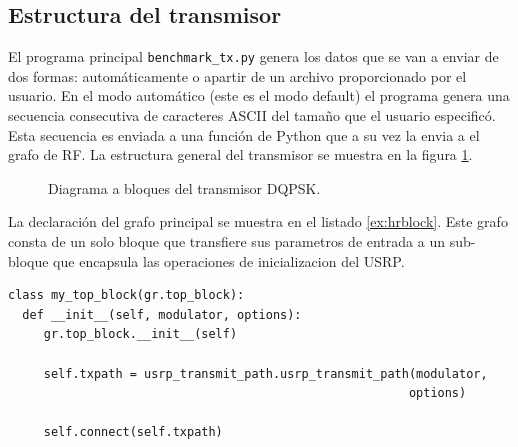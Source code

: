 \subsection{Estructura del transmisor}
El programa principal \verb|benchmark_tx.py| genera los datos que se van a enviar de dos formas:
autom\'aticamente o apartir de un archivo proporcionado por el usuario. En el modo autom\'atico
(este es el modo default) el programa genera una secuencia consecutiva de caracteres ASCII del tama\~no
que el usuario especific\'o. Esta secuencia es enviada a una funci\'on de Python que a su vez la
envia a el grafo de RF. La estructura general del transmisor se muestra en la figura
\ref{fig:grqpsk}.

\begin{figure}[htp]
  \centering
  \vspace{0.5in}
\vspace{0.5in}
\caption{Diagrama a bloques del transmisor DQPSK.}
\label{fig:grqpsk}
\end{figure}

La declaraci\'on del grafo principal se muestra en el listado \ref{ex:hrblock}. Este grafo consta de
un solo bloque que transfiere sus parametros de entrada a un sub-bloque que encapsula las
operaciones de inicializacion del USRP.
 
\begin{lstlisting}[float,frame=single,label=ex:hrblock,caption={Declaraci\'on del bloque
jer\'arquico principal.}]
class my_top_block(gr.top_block):
  def __init__(self, modulator, options):
     gr.top_block.__init__(self)

     self.txpath = usrp_transmit_path.usrp_transmit_path(modulator, 
                                                        options)

     self.connect(self.txpath)
\end{lstlisting}

